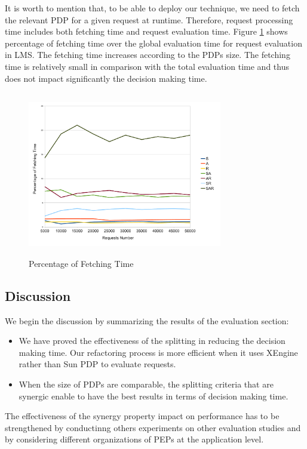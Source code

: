 It is worth to mention that, to be able to deploy our technique, we need to fetch the relevant PDP for a given request at runtime. 
Therefore, request processing time includes both fetching time and request evaluation time.
Figure \ref{Fetching Time} shows percentage of fetching time over the global evaluation time for request evaluation in LMS. 
The fetching time increases according to the PDPs size. The fetching time is relatively small in comparison with the total evaluation time and thus 
does not impact significantly the decision making time.
\begin{figure}[!h]
  \centering
\includegraphics[width=8.5cm, height=7.2cm]{fetching.pdf}
\begin{center}
\caption{Percentage of Fetching Time}
\label{Fetching Time}
\end{center}
\end{figure}
\subsection{Discussion}
We begin the discussion by summarizing the results of the evaluation section:
\begin{itemize}
 \item We have proved the effectiveness of the splitting in reducing the decision making time. Our refactoring process is more efficient when 
it uses XEngine rather than Sun PDP to evaluate requests.
 \item When the size of PDPs are comparable, the splitting criteria that are synergic enable to have the best results in terms of 
decision making time.
\end{itemize}
The effectiveness of the synergy property impact on performance has to be strengthened by conductinng others experiments 
on other evaluation studies and by considering different organizations of PEPs at the application level.